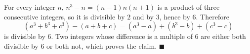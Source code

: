 For every integer $n$, $n^3-n=(n-1)n(n+1)$ is a product of three consecutive integers, so it is divisible by $2$ and by $3$, hence by $6$. Therefore
\[\left(a^3+b^3+c^3\right)-(a+b+c)=\left(a^3-a\right)+\left(b^3-b\right)+\left(c^3-c\right)\]
is divisible by $6$. Two integers whose difference is a multiple of $6$ are either both divisible by $6$ or both not, which proves the claim. $\blacksquare$
